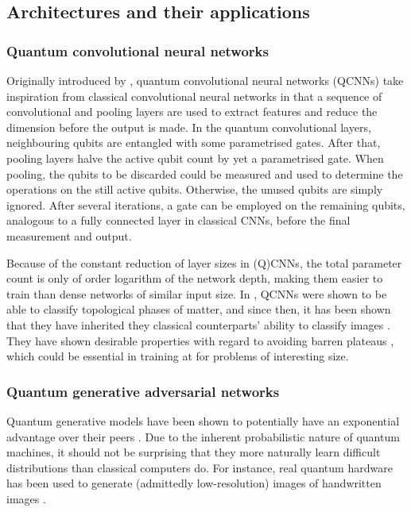 \subsection{Architectures and their applications}
\subsubsection{Quantum convolutional neural networks}
Originally introduced by \textcite{cong2019}, quantum convolutional neural networks (QCNNs) take inspiration from classical convolutional neural networks in that a sequence of convolutional and pooling layers are used to extract features and reduce the dimension before the output is made.
In the quantum convolutional layers, neighbouring qubits are entangled with some parametrised gates.
After that, pooling layers halve the active qubit count by yet a parametrised gate.
When pooling, the qubits to be discarded could be measured and used to determine the operations on the still active qubits.
Otherwise, the unused qubits are simply ignored.
After several iterations, a gate can be employed on the remaining qubits, analogous to a fully connected layer in classical CNNs, before the final measurement and output.

Because of the constant reduction of layer sizes in (Q)CNNs, the total parameter count is only of order logarithm of the network depth, making them easier to train than dense networks of similar input size.
In \cite{cong2019}, QCNNs were shown to be able to classify topological phases of matter, and since then, it has been shown that they have inherited they classical counterparts' ability to classify images \cite{oh2020}.
They have shown desirable properties with regard to avoiding barren plateaus \cite{pesah2021}, which could be essential in training at for problems of interesting size.

\subsubsection{Quantum generative adversarial networks}
Quantum generative models have been shown to potentially have an exponential advantage over their peers \cite{gao2018}.
Due to the inherent probabilistic nature of quantum machines, it should not be surprising that they more naturally learn difficult distributions than classical computers do.
For instance, real quantum hardware has been used to generate (admittedly low-resolution) images of handwritten images \cite{huang2021}.


